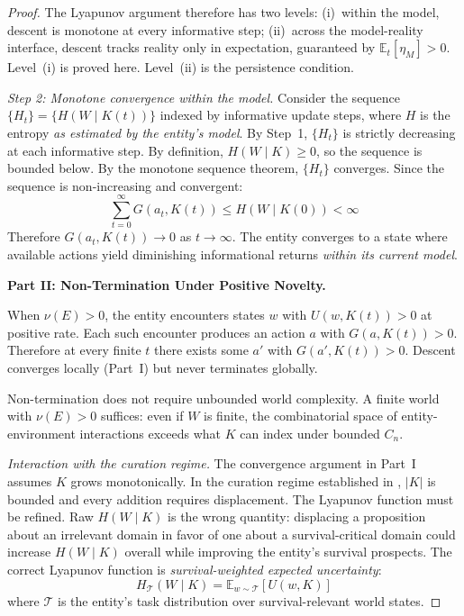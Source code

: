 \documentclass[11pt]{article}
\theoremstyle{definition}
\theoremstyle{remark}
\begin{document}
\begin{proof}
The Lyapunov argument therefore has two levels: (i)~within the model,
descent is monotone at every informative step; (ii)~across the
model-reality interface, descent tracks reality only in expectation,
guaranteed by $\mathbb{E}_t[\eta_M] > 0$. Level~(i) is proved here.
Level~(ii) is the persistence condition.

\emph{Step 2: Monotone convergence within the model.} Consider the
sequence $\{H_t\} = \{H(W \mid K(t))\}$ indexed by informative update
steps, where $H$ is the entropy \emph{as estimated by the entity's
model}. By Step~1, $\{H_t\}$ is strictly decreasing at each
informative step. By definition, $H(W \mid K) \geq 0$, so the sequence
is bounded below. By the monotone sequence theorem, $\{H_t\}$
converges. Since the sequence is non-increasing and convergent:
\[
\sum_{t=0}^{\infty} G(a_t, K(t)) \leq H(W \mid K(0)) < \infty
\]
Therefore $G(a_t, K(t)) \to 0$ as $t \to \infty$. The entity
converges to a state where available actions yield diminishing
informational returns \emph{within its current model}.

\textbf{Part II: Non-Termination Under Positive Novelty.}

When $\nu(E) > 0$, the entity encounters states $w$ with
$U(w, K(t)) > 0$ at positive rate. Each such encounter produces an
action $a$ with $G(a, K(t)) > 0$. Therefore at every finite $t$ there
exists some $a'$ with $G(a', K(t)) > 0$. Descent converges locally
(Part~I) but never terminates globally.

Non-termination does not require unbounded world complexity. A finite
world with $\nu(E) > 0$ suffices: even if $W$ is finite, the
combinatorial space of entity-environment interactions exceeds what $K$
can index under bounded $C_n$.

\emph{Interaction with the curation regime.} The convergence argument
in Part~I assumes $K$ grows monotonically. In
the curation regime established in \cite{McCarthy2026c}, $|K|$ is
bounded and every addition requires displacement. The
Lyapunov function must be refined. Raw $H(W \mid K)$ is the wrong
quantity: displacing a proposition about an irrelevant domain in favor
of one about a survival-critical domain could increase $H(W \mid K)$
overall while improving the entity's survival prospects. The correct
Lyapunov function is \emph{survival-weighted expected uncertainty}:
\[
H_{\mathcal{T}}(W \mid K) = \mathbb{E}_{w \sim \mathcal{T}}[U(w, K)]
\]
where $\mathcal{T}$ is the entity's task distribution over
survival-relevant world states.


\end{proof}
\end{document}
